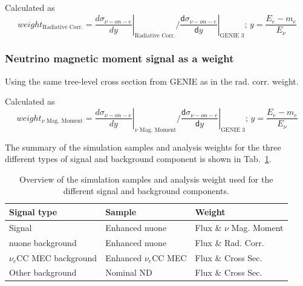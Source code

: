 Calculated as 
\begin{equation}
weight_{\text{Radiative Corr.}} = \left.\frac{d\sigma_{\nu-on-e}}{dy}\right|_{\text{Radiative Corr.}} / \left.\frac{\textsf{d}\sigma_{\nu-on-e}}{\textsf{d}y}\right|_{\text{GENIE 3}};\,y=\frac{E_e-m_e}{E_\nu}
\end{equation}

\subsubsection*{Neutrino magnetic moment signal as a weight}

Using the same tree-level cross section from GENIE as in the rad. corr. weight.


Calculated as 
\begin{equation}
weight_{\nu\text{ Mag. Moment}} = \left.\frac{d\sigma_{\nu-on-e}}{dy}\right|_{\nu\text{ Mag. Moment}} / \left.\frac{\textsf{d}\sigma_{\nu-on-e}}{\textsf{d}y}\right|_{\text{GENIE 3}};\,y=\frac{E_e-m_e}{E_\nu}
\end{equation}


The summary of the simulation samples and analysis weights for the three different types of signal and background component is shown in Tab.~\ref{tab:NuMMSamplesAndWeightsOverview}.

\begin{table}[!ht]
\centering
\caption{Overview of the simulation samples and analysis weight used for the different signal and background components.}
\def\arraystretch{1.4}
\begin{tabular}{l@{\hskip 1cm}l@{\hskip 1cm}l}
Signal type            & Sample               & Weight\\\hline
Signal                 & Enhanced \gls{nuone} & Flux \& $\nu$ Mag. Moment\\
\gls{nuone} background & Enhanced \gls{nuone} & Flux \& Rad. Corr.\\
$\nu_e$\gls{CC} \gls{MEC} background & Enhanced $\nu_e$\gls{CC} \gls{MEC} & Flux \& Cross Sec.\\
Other background       & Nominal \gls{ND}     & Flux \& Cross Sec.
\end{tabular}
\label{tab:NuMMSamplesAndWeightsOverview}
\end{table}

